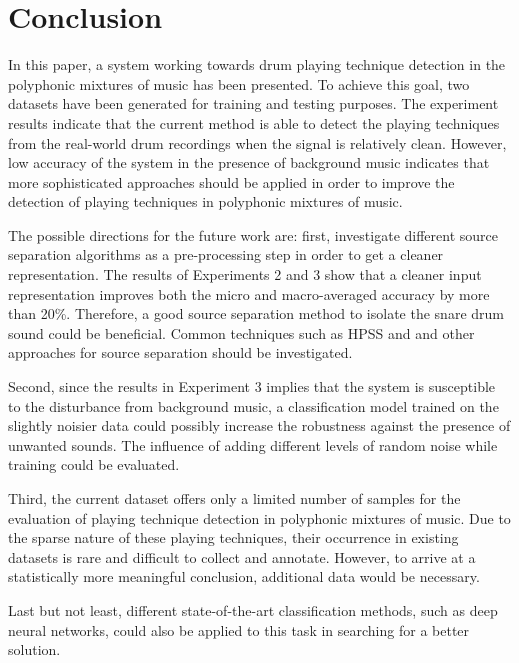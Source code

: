 \documentclass{article}
\begin{document}

\section{Conclusion}
\label{sec:conclusion}
In this paper, a system working towards drum playing technique detection in the polyphonic mixtures of music has been presented. To achieve this goal, two datasets have been generated for training and testing purposes. The experiment results indicate that the current method is able to detect the playing techniques from the real-world drum recordings when the signal is relatively clean. However, low accuracy of the system in the presence of background music indicates that more sophisticated approaches should be applied in order to improve the detection of playing techniques in polyphonic mixtures of music. 

The possible directions for the future work are: first, investigate different source separation algorithms as a pre-processing step in order to get a cleaner representation. The results of Experiments 2 and 3 show that a cleaner input representation improves both the micro and macro-averaged accuracy by more than 20\%. Therefore, a good source separation method to isolate the snare drum sound could be beneficial. Common techniques such as HPSS and and other approaches for source separation should be investigated.

Second, since the results in Experiment 3 implies that the system is susceptible to the disturbance from background music, a classification model trained on the slightly noisier data could possibly increase the robustness against the presence of unwanted sounds. The influence of adding different levels of random noise while training could be evaluated.

Third, the current dataset offers only a limited number of samples for the evaluation of playing technique detection in polyphonic mixtures of music. Due to the sparse nature of these playing techniques, their occurrence in existing datasets is rare and difficult to collect and annotate. However, to arrive at a statistically more meaningful conclusion, additional  data would be necessary.

Last but not least, different state-of-the-art classification methods, such as deep neural networks, could also be applied to this task in searching for a better solution.
\end{document}
